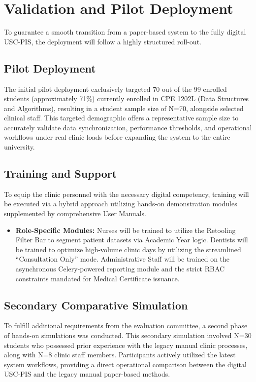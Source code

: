 \section{Validation and Pilot Deployment}

To guarantee a smooth transition from a paper-based system to the fully digital USC-PIS, the deployment will follow a highly structured roll-out.

\subsection{Pilot Deployment}

The initial pilot deployment exclusively targeted 70 out of the 99 enrolled students (approximately 71\%) currently enrolled in CPE 1202L (Data Structures and Algorithms), resulting in a student sample size of N=70, alongside selected clinical staff. This targeted demographic offers a representative sample size to accurately validate data synchronization, performance thresholds, and operational workflows under real clinic loads before expanding the system to the entire university.

\subsection{Training and Support}

To equip the clinic personnel with the necessary digital competency, training will be executed via a hybrid approach utilizing hands-on demonstration modules supplemented by comprehensive User Manuals.

\begin{itemize}
    \item \textbf{Role-Specific Modules:} Nurses will be trained to utilize the Retooling Filter Bar to segment patient datasets via Academic Year logic. Dentists will be trained to optimize high-volume clinic days by utilizing the streamlined ``Consultation Only'' mode. Administrative Staff will be trained on the asynchronous Celery-powered reporting module and the strict RBAC constraints mandated for Medical Certificate issuance.
\end{itemize}

\subsection{Secondary Comparative Simulation}

To fulfill additional requirements from the evaluation committee, a second phase of hands-on simulations was conducted. This secondary simulation involved N=30 students who possessed prior experience with the legacy manual clinic processes, along with N=8 clinic staff members. Participants actively utilized the latest system workflows, providing a direct operational comparison between the digital USC-PIS and the legacy manual paper-based methods.

